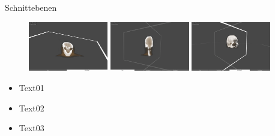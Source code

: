 \documentclass[final,hyperref={pdfpagelabels=false}]{beamer}
\begin{document}
\begin{frame}[t]
\begin{columns}[t]
\begin{column}{.025\textwidth}\end{column} %

\begin{column}{.465\textwidth}

\begin{block}{Schnittebenen}

   \begin{figure}
       \includegraphics[width=0.325\textwidth]{slide01}
       \vspace{10px}
       \includegraphics[width=0.325\textwidth]{slide02}
       \vspace{10px}
       \includegraphics[width=0.325\textwidth]{slide03}
   \end{figure}
%   
%   
%   
%   
%   
   \begin{itemize}
   \item Text01
   \item Text02
   \item Text03
   \end{itemize}
   
     
   
   
\end{block}



\end{column}
\end{columns}
\end{frame}
\end{document}
